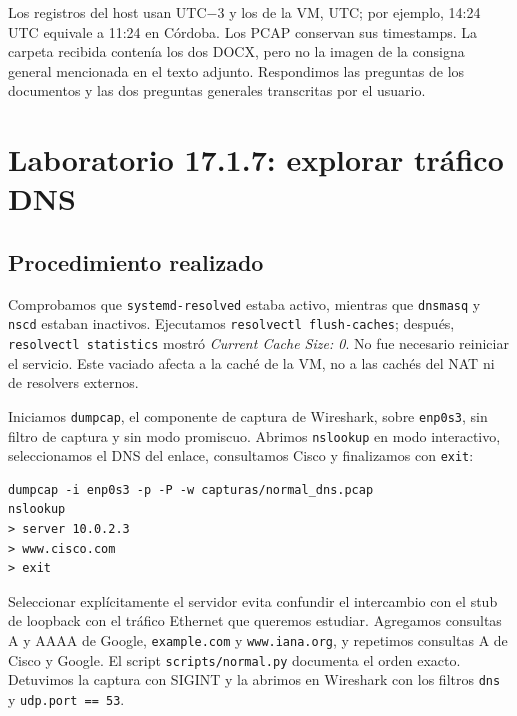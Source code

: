\documentclass[11pt,a4paper]{article}
\begin{document}
Los registros del host usan UTC$-3$ y los de la VM, UTC; por ejemplo,
14:24 UTC equivale a 11:24 en Córdoba. Los PCAP conservan sus timestamps.
La carpeta recibida contenía los dos DOCX, pero no la imagen de la consigna
general mencionada en el texto adjunto. Respondimos las preguntas de los
documentos y las dos preguntas generales transcritas por el usuario.

\section{Laboratorio 17.1.7: explorar tráfico DNS}
\label{sec:lab1}

\subsection{Procedimiento realizado}

Comprobamos que \texttt{systemd-resolved} estaba activo, mientras que
\texttt{dnsmasq} y \texttt{nscd} estaban inactivos. Ejecutamos
\texttt{resolvectl flush-caches}; después, \texttt{resolvectl statistics}
mostró \emph{Current Cache Size: 0}. No fue necesario reiniciar el servicio.
Este vaciado afecta a la caché de la VM, no a las cachés del NAT ni de
resolvers externos.

Iniciamos \texttt{dumpcap}, el componente de captura de Wireshark, sobre
\texttt{enp0s3}, sin filtro de captura y sin modo promiscuo. Abrimos
\texttt{nslookup} en modo interactivo, seleccionamos el DNS del enlace,
consultamos Cisco y finalizamos con \texttt{exit}:

\par\noindent\begin{minipage}{\linewidth}
\begin{lstlisting}
dumpcap -i enp0s3 -p -P -w capturas/normal_dns.pcap
nslookup
> server 10.0.2.3
> www.cisco.com
> exit
\end{lstlisting}
\end{minipage}\par\medskip

Seleccionar explícitamente el servidor evita confundir el intercambio con
el stub de loopback con el tráfico Ethernet que queremos estudiar. Agregamos
consultas A y AAAA de Google, \nolinkurl{example.com} y \nolinkurl{www.iana.org},
y repetimos consultas A de Cisco y Google. El script
\nolinkurl{scripts/normal.py} documenta el orden exacto. Detuvimos la captura
con SIGINT y la abrimos en Wireshark con los filtros \texttt{dns} y
\nolinkurl{udp.port == 53}.
\end{document}
